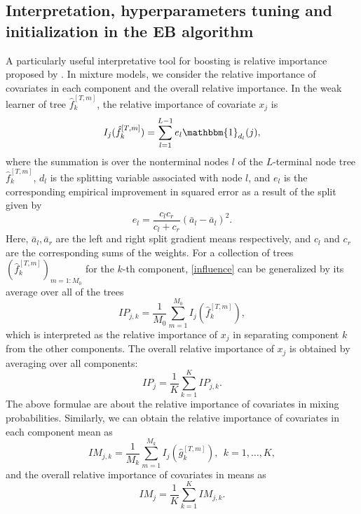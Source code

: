 \documentclass[11pt]{article}
\numberwithin{equation}{section}
\begin{document}
\subsection{Interpretation, hyperparameters tuning and initialization in the EB algorithm}
A particularly useful interpretative tool for boosting is relative importance proposed by \cite{breiman1983classification}.
In mixture models, we consider the relative importance of covariates in each component and the overall relative importance.
In the weak learner of tree $\hat{f}_k^{[T,m]}$,  the relative importance of covariate $x_j$ is
\begin{equation}\label{influence}
	I_j(\hat{f}_k^{[T,m]})=\sum_{l=1}^{L-1}{e}_l\mathbbm{1}_{d_l}(j),
\end{equation}
where the summation is over the nonterminal nodes $l$ of the $L$-terminal node tree $\hat{f}^{[T,m]}_k$, $d_l$ is the splitting variable associated with node $l$, and $e_l$ is the corresponding empirical improvement in squared error as a result of the split given by 
$$e_l=\frac{c_lc_r}{c_l+c_r}(\bar{a}_l-\bar{a}_l)^2.$$
Here, $\bar{a}_l,\bar{a}_r$ are the left and right split gradient means respectively, and $c_l$ and $c_r$ are the corresponding sums of the weights.
For a collection of trees $(\hat{f}^{[T,m]}_k)_{m=1:M_0}$ for the $k$-th component, \eqref{influence} can be generalized by its average over all of the trees
\begin{equation}
	IP_{j,k}=\frac{1}{M_0}\sum_{m=1}^{M_0} I_j(\hat{f}_k^{[T,m]}),
\end{equation}
which is interpreted as the relative importance of $x_j$ in separating component $k$ from the other components.
The overall relative importance of $x_j$ is obtained by averaging over all components:
$$
IP_{j}=\frac{1}{K}\sum_{k=1}^K IP_{j,k}.
$$
The above formulae are about the relative importance of covariates in mixing probabilities. Similarly, we can obtain the relative importance of covariates in each component mean as
\begin{equation}
	IM_{j,k}=\frac{1}{M_k}\sum_{m=1}^{M_k} I_j(\hat{g}_k^{[T,m]}),~~ k=1,\ldots,K,
\end{equation}
and the overall relative importance of covariates in means as
$$
IM_{j}=\frac{1}{K}\sum_{k=1}^K IM_{j,k}.
$$
\end{document}
